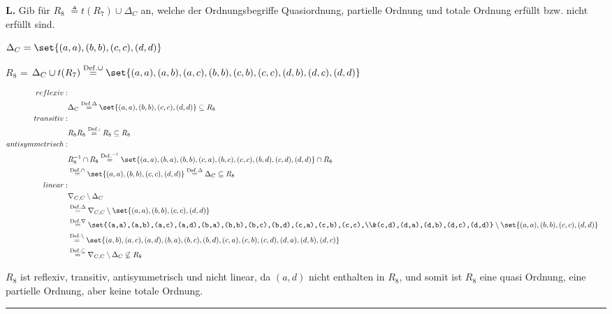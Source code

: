 \documentclass[10pt,leqno ]{article}
\DeclarePairedDelimiter\set\{\}
\newcommand\customeq[1]{\overset{\mathrm{#1}}{=}}
\theoremstyle{definition}
\newenvironment{solution}[1][L]{\begin{doublespace}\textbf{#1.}\quad }{\ \rule{0.5em}{0.5em}\end{doublespace}}
\begin{document}
\begin{solution}
Gib für $R_8$ \( \triangleq t(R_7) \cup \Delta_C \) an, welche der Ordnungsbegriffe Quasiordnung, partielle Ordnung und totale Ordnung erfüllt bzw. nicht erfüllt sind.

\( \Delta_C = \set{(a,a),(b,b),(c,c),(d,d)} \)

$R_8$ = \( \Delta_C \cup t(R_7)\customeq{Def. \cup} \set{(a,a),(a,b),(a,c),(b,b),(c,b),(c,c),(d,b),(d,c),(d,d)} \)

\begin{equation*}
   \begin{aligned}
   reflexiv: \\
   &\Delta_C \customeq{Def. \Delta} \set{(a,a),(b,b),(c,c),(d,d)} \subseteq{}R_8\\
   transitiv:\\ 
   & R_8R_8 \customeq{Def. ;} R_8\subseteq R_8\\
   antisymmetrisch:\\
   & R_8^{-1} \cap R_8 \customeq{Def. ^{-1}} \set{(a,a),(b,a),(b,b),(c,a),(b,c),(c,c),(b,d),(c,d),(d,d)} \cap R_8\\
   &\customeq{Def. \cap} \set{(a,a),(b,b),(c,c),(d,d)} \customeq{Def. \Delta} \Delta_C \subseteq{}R_8\\
   linear:\\
   &\nabla_{C,C} \setminus \Delta_C\\
   &\customeq{Def. \Delta} \nabla_{C,C} \setminus \set{(a,a),(b,b),(c,c),(d,d)}\\
   &\customeq{Def. \nabla} \set{(a,a),(a,b),(a,c),(a,d),(b,a),(b,b),(b,c),(b,d),(c,a),(c,b),(c,c),\\&(c,d),(d,a),(d,b),(d,c),(d,d)} \setminus \set{(a,a),(b,b),(c,c),(d,d)}\\
   &\customeq{Def. \setminus} \set{(a, b),(a, c),(a, d),(b, a),(b, c),(b, d),(c, a),(c, b),(c, d),(d, a),(d, b),(d, c)}\\
   &\customeq{Def. \subseteq}\nabla_{C,C} \setminus \Delta_C \not \subseteq R_8\\
    \end{aligned}
\end{equation*}

\(R_8\) ist reflexiv, transitiv, antisymmetrisch und nicht linear, da $(a,d)$ nicht enthalten in $R_8$, und somit ist $R_8$ eine quasi Ordnung, eine partielle Ordnung, aber keine totale Ordnung.
\end{solution}

\end{document}
